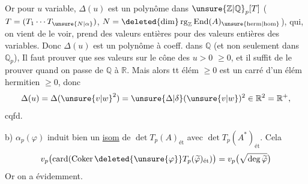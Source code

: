Or pour $u$ variable, $\Delta(u)$ est un polynôme dans $\unsure{\mathbb Z|\mathbb Q}_p[T]$ ($T=(T_1\cdots T_{\unsure{N|\alpha}})$, $N=\deleted{\dim}\operatorname{rg}_{\mathbb Z}\operatorname{End}(A)_{\unsure{\mathrm{herm}|\mathrm{hom}}}$), qui, on vient de le voir, prend des valeurs entières pour des valeurs entières des variables. Donc $\Delta(u)$ est un polynôme à coeff.  dans $\mathbb Q$ (et non seulement dans $\mathbb Q_p$), 
Il faut prouver que ses valeurs sur le cône des $u>0$  $\geq0$, et  il suffit de le prouver quand on passe de $\mathbb Q$ à $\mathbb R$. Mais alors tt élém $\geq0$ est un carré d'un élém hermitien  $\geq0$, donc
\[
\Delta(u)=\Delta(\unsure{v|w}^2)=\unsure{\Delta|\delta}(\unsure{v|w})^2\in\mathbb R^2=\mathbb R^+,
\]
cqfd.

b) $\alpha_p(\varphi)$ induit bien un \uline{isom} de $\det T_p(A)_{\text{ét}}$ avec $\det T_p(A^*)_{\text{ét}}$. Cela 
\[
v_p\bigl(\operatorname{card}(\operatorname{Coker}\deleted{\unsure{\varphi}}T_p(\widetilde\varphi)_{\text{ét}})\bigr)=v_p\bigl(\sqrt{\deg\widetilde\varphi}\bigr)
\]
Or on a évidemment.

